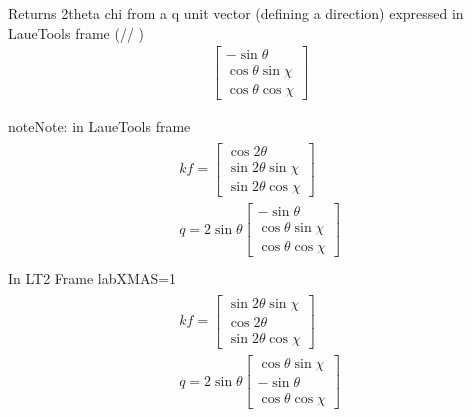 \documentclass[letterpaper,10pt,english]{sphinxmanual}
\begin{document}
\begin{fulllineitems}
\label{\detokenize{Simulation_Module:LaueTools.LaueGeometry.from_qunit_to_twchi}}
Returns 2theta chi from a q unit vector (defining a direction) expressed in LaueTools frame (// ) 
\begin{equation*}
\begin{split}\left [ \begin{matrix}
-\sin \theta \\ \cos \theta \sin \chi \\ \cos \theta \cos \chi
\end{matrix}
\right ]\end{split}
\end{equation*}
\begin{sphinxadmonition}{note}{Note:}
in LaueTools frame
\begin{align*}\!\begin{aligned}
kf = \left [ \begin{matrix}
\cos 2\theta \\ \sin 2\theta \sin \chi \\ \sin 2\theta \cos \chi
\end{matrix}
\right ]\\
q = 2 \sin \theta \left [ \begin{matrix}
-\sin \theta \\ \cos \theta \sin \chi \\ \cos \theta \cos \chi
\end{matrix}
\right ]\\
\end{aligned}\end{align*}
In LT2 Frame   labXMAS=1
\begin{align*}\!\begin{aligned}
kf = \left [ \begin{matrix}
\sin 2\theta \sin \chi \\ \cos 2\theta \\ \sin 2\theta \cos \chi
\end{matrix}
\right ]\\
q = 2 \sin \theta \left [ \begin{matrix}
\cos \theta \sin \chi \\ -\sin \theta \\ \cos \theta \cos \chi
\end{matrix}
\right ]\\
\end{aligned}\end{align*}\end{sphinxadmonition}

\end{fulllineitems}
\end{document}
